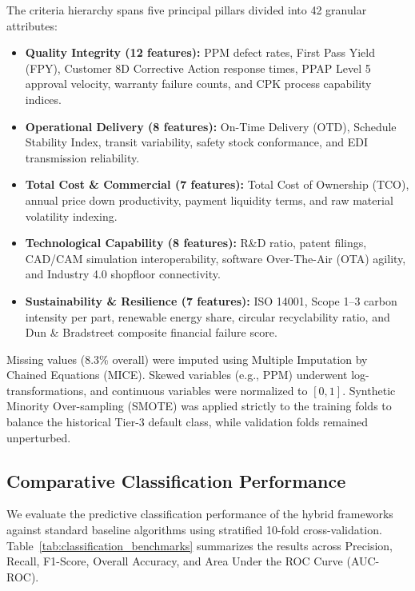 \documentclass[twocolumn,10pt]{article}
\begin{document}
The criteria hierarchy spans five principal pillars divided into 42 granular attributes:
\begin{itemize}
    \item \textbf{Quality Integrity (12 features):} PPM defect rates, First Pass Yield (FPY), Customer 8D Corrective Action response times, PPAP Level 5 approval velocity, warranty failure counts, and CPK process capability indices.
    \item \textbf{Operational Delivery (8 features):} On-Time Delivery (OTD), Schedule Stability Index, transit variability, safety stock conformance, and EDI transmission reliability.
    \item \textbf{Total Cost \& Commercial (7 features):} Total Cost of Ownership (TCO), annual price down productivity, payment liquidity terms, and raw material volatility indexing.
    \item \textbf{Technological Capability (8 features):} R\&D ratio, patent filings, CAD/CAM simulation interoperability, software Over-The-Air (OTA) agility, and Industry 4.0 shopfloor connectivity.
    \item \textbf{Sustainability \& Resilience (7 features):} ISO 14001, Scope 1--3 carbon intensity per part, renewable energy share, circular recyclability ratio, and Dun \& Bradstreet composite financial failure score.
\end{itemize}

Missing values (8.3\% overall) were imputed using Multiple Imputation by Chained Equations (MICE). Skewed variables (e.g., PPM) underwent log-transformations, and continuous variables were normalized to $[0, 1]$. Synthetic Minority Over-sampling (SMOTE) was applied strictly to the training folds to balance the historical Tier-3 default class, while validation folds remained unperturbed.

\subsection{Comparative Classification Performance}
We evaluate the predictive classification performance of the hybrid frameworks against standard baseline algorithms using stratified 10-fold cross-validation. Table~\ref{tab:classification_benchmarks} summarizes the results across Precision, Recall, F1-Score, Overall Accuracy, and Area Under the ROC Curve (AUC-ROC).
\end{document}
